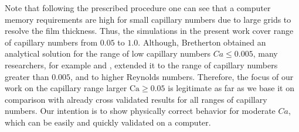 \documentclass[preprint,12pt]{elsarticle}
\newcommand{\Ca}{\mathrm{Ca}}
\begin{document}
{\begin{description}
\end{description}
}
Note that following the prescribed procedure one can see that a computer memory requirements are
high for small capillary numbers due to large grids to resolve the film thickness. Thus, the
simulations in the present work cover range of capillary numbers from $0.05$ to $1.0$.
Although, Bretherton obtained an analytical solution for the range of low capillary
numbers $Ca \leq 0.005$, many researchers, for example \citet{giavedoni-numerical} and
\citet{heil-bretherton}, extended it to the range of capillary numbers
greater than
$0.005$, and to higher Reynolds numbers. %
Therefore, the focus of our work on the capillary range larger $\Ca\geq0.05$ is legitimate as far
as we base it on comparison with already cross validated
results for all ranges of capillary numbers.  Our intention is
  to show physically correct behavior for moderate $Ca$,
which
  can be easily and quickly validated on a computer.
\end{document}
